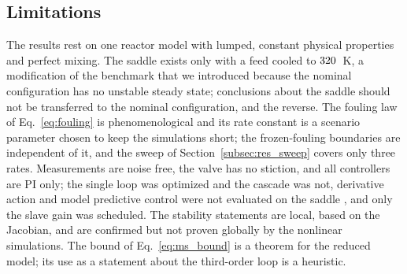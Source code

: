 \subsection{Limitations}
The results rest on one reactor model with lumped, constant physical properties and perfect mixing. The saddle exists only with a feed cooled to $320$~K, a modification of the benchmark that we introduced because the nominal configuration has no unstable steady state; conclusions about the saddle should not be transferred to the nominal configuration, and the reverse. The fouling law of Eq.~\eqref{eq:fouling} is phenomenological and its rate constant is a scenario parameter chosen to keep the simulations short; the frozen-fouling boundaries are independent of it, and the sweep of Section~\ref{subsec:res_sweep} covers only three rates. Measurements are noise free, the valve has no stiction, and all controllers are PI only; the single loop was optimized and the cascade was not, derivative action and model predictive control were not evaluated on the saddle \cite{rawlings2020model,andrade2026when}, and only the slave gain was scheduled. The stability statements are local, based on the Jacobian, and are confirmed but not proven globally by the nonlinear simulations. The bound of Eq.~\eqref{eq:ms_bound} is a theorem for the reduced model; its use as a statement about the third-order loop is a heuristic.
